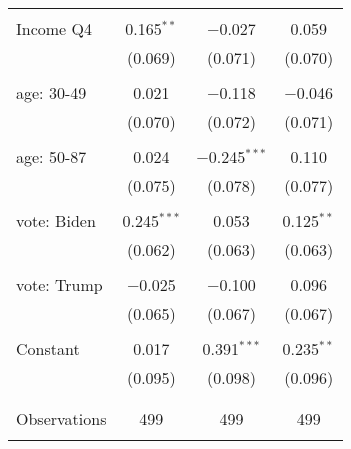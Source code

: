 \begin{tabular}{@{\extracolsep{5pt}}lccc}
  & & & \\ 
 Income Q4 & 0.165$^{**}$ & $-$0.027 & 0.059 \\ 
  & (0.069) & (0.071) & (0.070) \\ 
  & & & \\ 
 age: 30-49 & 0.021 & $-$0.118 & $-$0.046 \\ 
  & (0.070) & (0.072) & (0.071) \\ 
  & & & \\ 
 age: 50-87 & 0.024 & $-$0.245$^{***}$ & 0.110 \\ 
  & (0.075) & (0.078) & (0.077) \\ 
  & & & \\ 
 vote: Biden & 0.245$^{***}$ & 0.053 & 0.125$^{**}$ \\ 
  & (0.062) & (0.063) & (0.063) \\ 
  & & & \\ 
 vote: Trump & $-$0.025 & $-$0.100 & 0.096 \\ 
  & (0.065) & (0.067) & (0.067) \\ 
  & & & \\ 
 Constant & 0.017 & 0.391$^{***}$ & 0.235$^{**}$ \\ 
  & (0.095) & (0.098) & (0.096) \\ 
  & & & \\ 
\hline \\[-1.8ex] 

Observations & 499 & 499 & 499 \\ 
\hline 
\hline \\[-1.8ex] 
\end{tabular} 